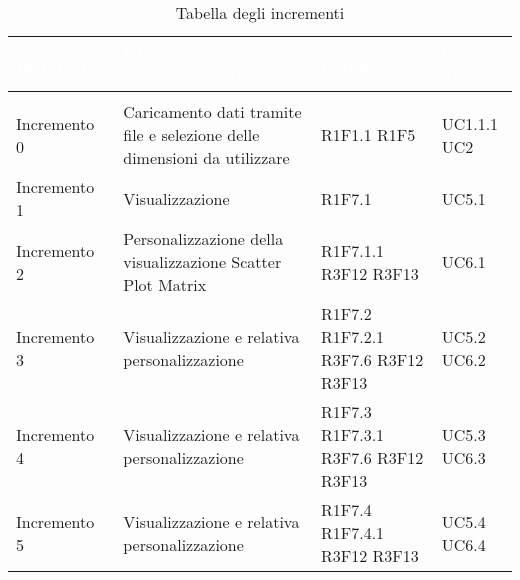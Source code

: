 \begin{longtable}{C{3cm} C{7cm} C{2cm} C{2cm}}
\textcolor{white}{\textbf{Incremento}} & 
\textcolor{white}{\textbf{Obiettivo dell'incremento}} & 
\textcolor{white}{\textbf{Requisiti}} &
\textcolor{white}{\textbf{Casi d'uso}}\\
\endfirsthead
{}\\
\endfoot
{}\caption{Tabella degli incrementi}
\endlastfoot

Incremento 0 & 
Caricamento dati tramite file e selezione delle dimensioni da utilizzare & 
R1F1.1 \newline R1F5 & 
UC1.1.1 \newline UC2\\
Incremento 1 &
Visualizzazione  & 
R1F7.1 &  
UC5.1 \\
Incremento 2 & 
Personalizzazione della visualizzazione Scatter Plot Matrix & 
R1F7.1.1 \newline R3F12 \newline R3F13& 
UC6.1\\
Incremento 3 & 
Visualizzazione  e relativa personalizzazione & 
R1F7.2 \newline R1F7.2.1 \newline R3F7.6 \newline R3F12 \newline R3F13& 
UC5.2 \newline UC6.2\\
Incremento 4 & 
Visualizzazione  e relativa personalizzazione & 
R1F7.3 \newline R1F7.3.1 \newline R3F7.6 \newline R3F12 \newline R3F13& 
UC5.3 \newline UC6.3\\
Incremento 5 & 
Visualizzazione  e relativa personalizzazione & 
R1F7.4 \newline R1F7.4.1 \newline R3F12 \newline R3F13& 
UC5.4 \newline UC6.4\\

\end{longtable}
